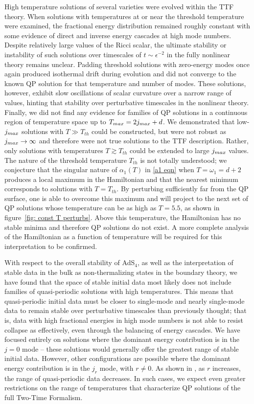 \documentclass[../PhD.tex]{subfiles}
\begin{document}
High temperature solutions of several varieties were evolved within the TTF theory. When solutions with temperatures at or near the threshold temperature were examined, the fractional energy distribution remained roughly constant with some evidence of direct and inverse energy cascades at high mode numbers. Despite relatively large values of the Ricci scalar, the ultimate stability or instability of such solutions over timescales of $t \sim \epsilon^{-2}$ in the fully nonlinear theory remains unclear. Padding threshold solutions with zero-energy modes once again produced isothermal drift during evolution and did not converge to the known QP solution for that temperature and number of modes. These solutions, however, exhibit slow oscillations of scalar curvature over a narrow range of values, hinting that stability over perturbative timescales in the nonlinear theory. Finally, we did not find any evidence for families of QP solutions in a continuous region of temperature space up to $T_{max} = 2j_{max} + d$. We demonstrated that low-$j_{max}$ solutions with $T \gg T_{th}$ could be constructed, but were not robust as $j_{max} \to \infty$ and therefore were not true solutions to the TTF description. Rather, only solutions with temperatures $T \gtrsim T_{th}$ could be extended to large $j_{max}$ values. The nature of the threshold temperature $T_{th}$ is not totally understood; we conjecture that the singular nature of $\alpha_1 (T)$ in \eqref{a1 eqn} when $T = \omega_1 = d + 2$ produces a local maximum in the Hamiltonian and that the nearest minimum corresponds to solutions with $T = T_{th}$. By perturbing sufficiently far from the QP surface, one is able to overcome this maximum and will project to the next set of QP solutions whose temperature can be as high as $T = 5.5$, as shown in figure~\ref{fig: const T perturbs}. Above this temperature, the Hamiltonian has no stable minima and therefore QP solutions do not exist. A more complete analysis of the Hamiltonian as a function of temperature will be required for this interpretation to be confirmed.

With respect to the overall stability of AdS$_4$, as well as the interpretation of stable data in the bulk as non-thermalizing states in the boundary theory, we have found that the space of stable initial data most likely does not include families of quasi-periodic solutions with high temperatures. This means that quasi-periodic initial data must be closer to single-mode and nearly single-mode data to remain stable over perturbative timescales than previously thought; that is, data with high fractional energies in high mode numbers is not able to resist collapse as effectively, even through the balancing of energy cascades. We have focused entirely on solutions where the dominant energy contribution is in the $j = 0$ mode -- these solutions would generally offer the greatest range of stable initial data. However, other configurations are possible where the dominant energy contribution is in the $j_r$ mode, with $r \neq 0$. As shown in \cite{1507.08261}, as $r$ increases, the range of quasi-periodic data decreases. In such cases, we expect even greater restrictions on the range of temperatures that characterize QP solutions of the full Two-Time Formalism. 
\end{document}
